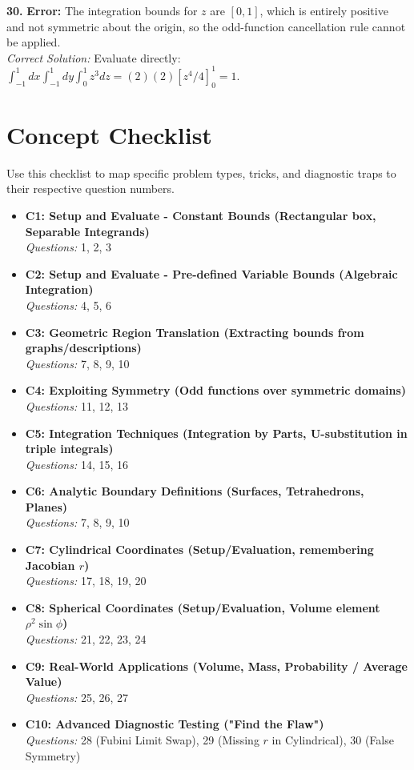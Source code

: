 \documentclass[11pt]{article}
\begin{document}
\textbf{30.} \textbf{Error:} The integration bounds for $z$ are $[0,1]$, which is entirely positive and not symmetric about the origin, so the odd-function cancellation rule cannot be applied. \\
\textit{Correct Solution:} Evaluate directly: $\int_{-1}^1 dx \int_{-1}^1 dy \int_0^1 z^3 dz = (2)(2)[z^4/4]_0^1 = 1$.


\newpage
\section*{Concept Checklist}
Use this checklist to map specific problem types, tricks, and diagnostic traps to their respective question numbers.

\begin{itemize}
    \item \textbf{C1: Setup and Evaluate - Constant Bounds (Rectangular box, Separable Integrands)} \\
    \textit{Questions:} 1, 2, 3
    \item \textbf{C2: Setup and Evaluate - Pre-defined Variable Bounds (Algebraic Integration)} \\
    \textit{Questions:} 4, 5, 6
    \item \textbf{C3: Geometric Region Translation (Extracting bounds from graphs/descriptions)} \\
    \textit{Questions:} 7, 8, 9, 10
    \item \textbf{C4: Exploiting Symmetry (Odd functions over symmetric domains)} \\
    \textit{Questions:} 11, 12, 13
    \item \textbf{C5: Integration Techniques (Integration by Parts, U-substitution in triple integrals)} \\
    \textit{Questions:} 14, 15, 16
    \item \textbf{C6: Analytic Boundary Definitions (Surfaces, Tetrahedrons, Planes)} \\
    \textit{Questions:} 7, 8, 9, 10
    \item \textbf{C7: Cylindrical Coordinates (Setup/Evaluation, remembering Jacobian $r$)} \\
    \textit{Questions:} 17, 18, 19, 20
    \item \textbf{C8: Spherical Coordinates (Setup/Evaluation, Volume element $\rho^2 \sin\phi$)} \\
    \textit{Questions:} 21, 22, 23, 24
    \item \textbf{C9: Real-World Applications (Volume, Mass, Probability / Average Value)} \\
    \textit{Questions:} 25, 26, 27
    \item \textbf{C10: Advanced Diagnostic Testing ("Find the Flaw")} \\
    \textit{Questions:} 28 (Fubini Limit Swap), 29 (Missing $r$ in Cylindrical), 30 (False Symmetry)
\end{itemize}
\end{document}
